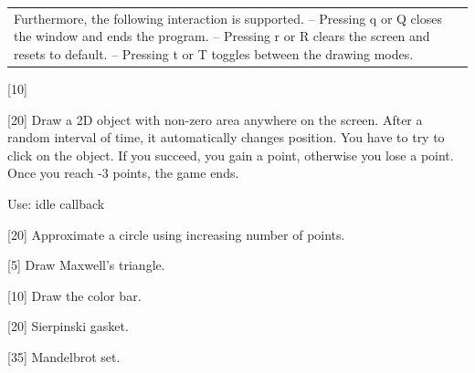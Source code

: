 \documentclass[addpoints]{exam}
\begin{document}
\begin{questions}
\begin{tabularx}{\textwidth}{lX}
    Furthermore, the following interaction is supported.\newline
    -- Pressing q or Q closes the window and ends the program.\newline
    -- Pressing r or R clears the screen and resets to default.\newline
    -- Pressing t or T toggles between the drawing modes.
  \end{tabularx}

  [10]

  [20]
  Draw a 2D object with non-zero area anywhere on the screen. After a random interval of time, it automatically changes position. You have to try to click on the object. If you succeed, you gain a point, otherwise you lose a point. Once you reach -3 points, the game ends.

  Use: idle callback

  [20]
  Approximate a circle using increasing number of points.

  [5]
  Draw Maxwell's triangle.

  [10]
  Draw the color bar.

  [20]
  Sierpinski gasket.

  [35]
  Mandelbrot set.


  
  
\end{questions}
\end{document}
